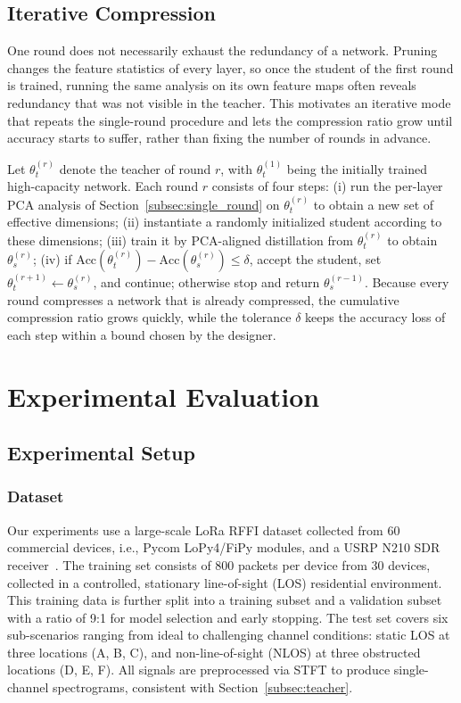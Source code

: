 \documentclass[journal,comsoc]{IEEEtran}
\begin{document}
\subsection{Iterative Compression}
\label{subsec:iterative}

One round does not necessarily exhaust the redundancy of a network.
Pruning changes the feature statistics of every layer, so once the student of the first round is trained, running the same analysis on its own feature maps often reveals redundancy that was not visible in the teacher.
This motivates an iterative mode that repeats the single-round procedure and lets the compression ratio grow until accuracy starts to suffer, rather than fixing the number of rounds in advance.

Let $\theta_t^{(r)}$ denote the teacher of round $r$, with $\theta_t^{(1)}$ being the initially trained high-capacity network.
Each round $r$ consists of four steps:
(i) run the per-layer PCA analysis of Section~\ref{subsec:single_round} on $\theta_t^{(r)}$ to obtain a new set of effective dimensions;
(ii) instantiate a randomly initialized student according to these dimensions;
(iii) train it by PCA-aligned distillation from $\theta_t^{(r)}$ to obtain $\theta_s^{(r)}$;
(iv) if $\text{Acc}(\theta_t^{(r)}) - \text{Acc}(\theta_s^{(r)}) \le \delta$, accept the student, set $\theta_t^{(r+1)} \leftarrow \theta_s^{(r)}$, and continue; otherwise stop and return $\theta_s^{(r-1)}$.
Because every round compresses a network that is already compressed, the cumulative compression ratio grows quickly, while the tolerance $\delta$ keeps the accuracy loss of each step within a bound chosen by the designer.


\section{Experimental Evaluation}
\label{sec:experimental_evaluation}


\subsection{Experimental Setup}
\label{subsec:experimental_setup}

\subsubsection{Dataset}
\label{subsubsec:dataset_description}

Our experiments use a large-scale LoRa RFFI dataset collected from 60 commercial devices, i.e., Pycom LoPy4/FiPy modules, and a USRP N210 SDR receiver~\cite{9715147}.
The training set consists of 800 packets per device from 30 devices, collected in a controlled, stationary line-of-sight (LOS) residential environment.
This training data is further split into a training subset and a validation subset with a ratio of 9:1 for model selection and early stopping.
The test set covers six sub-scenarios ranging from ideal to challenging channel conditions: static LOS at three locations (A, B, C), and non-line-of-sight (NLOS) at three obstructed locations (D, E, F).
All signals are preprocessed via STFT to produce single-channel spectrograms, consistent with Section~\ref{subsec:teacher}.
\end{document}
